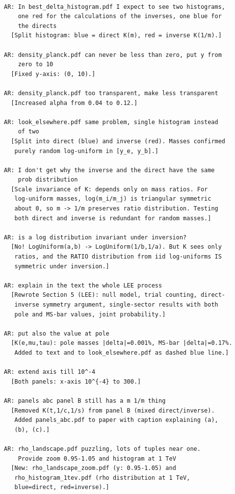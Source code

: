 \documentclass[11pt,a4paper]{article}
\begin{document}
\begin{Verbatim}[fontsize=\footnotesize]
% === SESSION 4: LEE, histograms, panels (2026-03-10) ===

AR: In best_delta_histogram.pdf I expect to see two histograms,
    one red for the calculations of the inverses, one blue for
    the directs
  [Split histogram: blue = direct K(m), red = inverse K(1/m).]

AR: density_planck.pdf can never be less than zero, put y from
    zero to 10
  [Fixed y-axis: (0, 10).]

AR: density_planck.pdf too transparent, make less transparent
  [Increased alpha from 0.04 to 0.12.]

AR: look_elsewhere.pdf same problem, single histogram instead
    of two
  [Split into direct (blue) and inverse (red). Masses confirmed
   purely random log-uniform in [y_e, y_b].]

AR: I don't get why the inverse and the direct have the same
    prob distribution
  [Scale invariance of K: depends only on mass ratios. For
   log-uniform masses, log(m_i/m_j) is triangular symmetric
   about 0, so m -> 1/m preserves ratio distribution. Testing
   both direct and inverse is redundant for random masses.]

AR: is a log distribution invariant under inversion?
  [No! LogUniform(a,b) -> LogUniform(1/b,1/a). But K sees only
   ratios, and the RATIO distribution from iid log-uniforms IS
   symmetric under inversion.]

AR: explain in the text the whole LEE process
  [Rewrote Section 5 (LEE): null model, trial counting, direct-
   inverse symmetry argument, single-sector results with both
   pole and MS-bar values, joint probability.]

AR: put also the value at pole
  [K(e,mu,tau): pole masses |delta|=0.001%, MS-bar |delta|=0.17%.
   Added to text and to look_elsewhere.pdf as dashed blue line.]

AR: extend axis till 10^-4
  [Both panels: x-axis 10^{-4} to 300.]

AR: panels abc panel B still has a m 1/m thing
  [Removed K(t,1/c,1/s) from panel B (mixed direct/inverse).
   Added panels_abc.pdf to paper with caption explaining (a),
   (b), (c).]

AR: rho_landscape.pdf puzzling, lots of tuples near one.
    Provide zoom 0.95-1.05 and histogram at 1 TeV
  [New: rho_landscape_zoom.pdf (y: 0.95-1.05) and
   rho_histogram_1tev.pdf (rho distribution at 1 TeV,
   blue=direct, red=inverse).]
\end{Verbatim}
\end{document}
